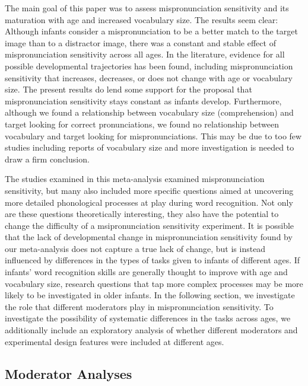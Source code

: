 \documentclass[man]{apa6}
\begin{document}
The main goal of this paper was to assess mispronunciation sensitivity and its maturation with age and increased vocabulary size. The results seem clear: Although infants consider a mispronunciation to be a better match to the target image than to a distractor image, there was a constant and stable effect of mispronunciation sensitivity across all ages. In the literature, evidence for all possible developmental trajectories has been found, including mispronunciation sensitivity that increases, decreases, or does not change with age or vocabulary size. The present results do lend some support for the proposal that mispronunciation sensitivity stays constant as infants develop. Furthermore, although we found a relationship between vocabulary size (comprehension) and target looking for correct pronunciations, we found no relationship between vocabulary and target looking for mispronunciations. This may be due to too few studies including reports of vocabulary size and more investigation is needed to draw a firm conclusion.

The studies examined in this meta-analysis examined mispronunciation sensitivity, but many also included more specific questions aimed at uncovering more detailed phonological processes at play during word recognition. Not only are these questions theoretically interesting, they also have the potential to change the difficulty of a msipronunciation sensitivity experiment. It is possible that the lack of developmental change in mispronunciation sensitivity found by our meta-analysis does not capture a true lack of change, but is instead influenced by differences in the types of tasks given to infants of different ages. If infants' word recognition skills are generally thought to improve with age and vocabulary size, research questions that tap more complex processes may be more likely to be investigated in older infants. In the following section, we investigate the role that different moderators play in mispronunciation sensitivity. To investigate the possibility of systematic differences in the tasks across ages, we additionally include an exploratory analysis of whether different moderators and experimental design features were included at different ages.

\hypertarget{moderator-analyses}{%
\subsection{Moderator Analyses}\label{moderator-analyses}}
\end{document}
